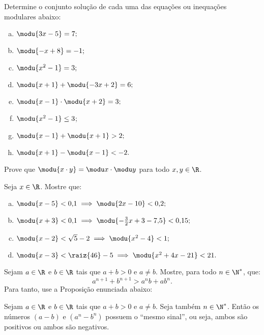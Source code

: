 \begin{exercise}
Determine o conjunto solução de cada uma das equações ou
inequações modulares abaixo:
\begin{enumerate}[a)]
  \item $\modu {3x - 5}= 7;$
  \item $\modu {-x +8} = -1;$
  \item $\modu{x^2 - 1}= 3;$
  \item $\modu{x +1} + \modu { -3x +2} = 6;$
  \item $\modu{x-1} \cdot \modu{x+2} = 3;$
  \item $\modu{x^2-1}\le 3$;
  \item $\modu{x-1}+ \modu{x+1}>2;$
  \item $\modu{x+1}- \modu{x-1}<-2.$
\end{enumerate}
\end{exercise}

\begin{exercise}
Prove que $\modu{x\cdot y } = \modu x \cdot \modu y$ para todo
$x, y \in \R$.
\end{exercise}

\begin{exercise}
Seja $x \in \R$. Mostre que:
\begin{enumerate}[a)]
    \item $\modu{x-5}<0{,}1 \implies \modu{2x - 10}< 0{,}2;$
    \item $\modu{x+3}<0{,}1 \implies \modu{-\frac 3 2 x + 3 -
    7{,}5}<0{,}15;$
    \item $\modu{x-2}< \sqrt{5} - 2 \implies \modu{x^2 - 4}< 1;$
    \item $\modu{ x - 3 } < \raiz{46} - 5 \implies \modu{ x^2 + 4x - 21 } < 21.$
\end{enumerate}
\end{exercise}

\begin{exercise}
  Sejam $a \in \R$ e $b \in \R$ tais que $a+b>0$ e $a \neq b$. Mostre, para todo $n \in \N^\ast$, que:
  $$ a^{n+1} + b^{n+1} > a^n b + ab^n.$$
  Para tanto, use a Proposição enunciada abaixo:
  \begin{proposition}
    Sejam $a \in \R$ e $b \in \R$ tais que $a+b>0$ e $a \neq b$. Seja também $n \in \N^\ast$. Então os números $(a-b)$ e $(a^n-b^n)$ possuem o ``mesmo sinal'', ou seja, ambos são positivos ou ambos são negativos.
  \end{proposition}
\end{exercise}

